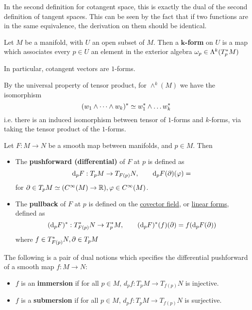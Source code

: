 \documentclass{article}
\begin{document}
\begin{remark}
    In the second definition for cotangent space, this is exactly the dual of the second definition of tangent spaces. This can be seen by the fact that if two functions are in the same equivalence, the derivation on them should be identical.
\end{remark}

\begin{definition}
    Let $M$ be a manifold, with $U$ an open subset of $M$. Then a \textbf{$\bm{k}$-form} on $U$ is a map which associates every $p \in U$ an element in the exterior algebra $\omega_p \in \Lambda^k(T_p^{\ast} M)$
\end{definition}

\begin{remark}
    In particular, cotangent vectors are $1$-forms.
\end{remark}

\begin{remark}
    By the universal property of tensor product, for $\wedge^k(M)$ we have the isomorphism
    \[
        (w_1 \wedge \dots \wedge w_k)^{\ast} \simeq w_1^{\ast} \wedge \dots w_k^{\ast}
    \]
    i.e. there is an induced isomorphism between tensor of $1$-forms and $k$-forms, via taking the tensor product of the $1$-forms.
\end{remark}

\begin{definition}
    Let $F: M \to N$ be a smooth map between manifolds, and $p \in M$. Then
    \begin{itemize}
        \item The \textbf{pushforward (differential)} of $F$ at $p$ is defined as
        \[
            \mathrm{d}_p F: T_p M \to T_{F(p)} N, \qquad \mathrm{d}_p F (\partial) (\varphi) = 
        \]
        for $\partial \in T_p M \simeq (C^{\infty}(M) \to \mathbb{R}), \varphi \in C^{\infty}(M)$.
        \item The \textbf{pullback} of $F$ at $p$ is defined on the \underline{covector field}, or \underline{linear forms}, defined as 
        \[
            (\mathrm{d}_p F)^{\ast}: T_{F(p)}^{\ast}N \to T_p^{\ast} M, \qquad (\mathrm{d}_p F)^{\ast}(f)(\partial) = f(\mathrm{d}_p F(\partial))
        \]
        where $f \in T_{F(p)}^{\ast} N, \partial \in T_p M$
    \end{itemize}
\end{definition}

\begin{definition}
    The following is a pair of dual notions which specifies the differential pushforward of a smooth map $f: M \to N$:
    \begin{itemize}
        \item $f$ is an \textbf{immersion} if for all $p \in M$, $d_p f : T_p  M \to T_{f(p)} N$ is injective.
        \item $f$ is a \textbf{submersion} if for all $p \in M$, $d_p f : T_p  M \to T_{f(p)} N$ is surjective.
    \end{itemize}
\end{definition}
\end{document}
